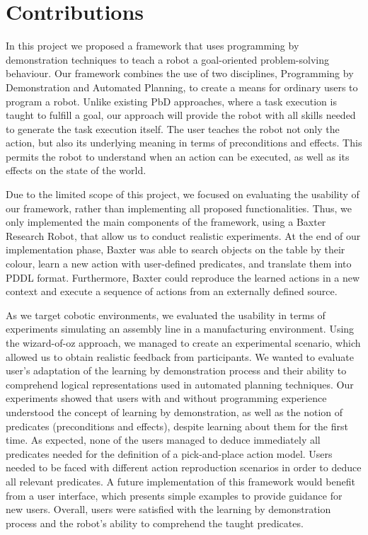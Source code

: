 \section{Contributions}
In this project we proposed a framework that uses programming by demonstration techniques to teach a robot a goal-oriented problem-solving behaviour.
Our framework combines the use of two disciplines, Programming by Demonstration and Automated Planning, to create a means for ordinary users to program a robot.
Unlike existing PbD approaches, where a task execution is taught to fulfill a goal, our approach will provide the robot with all skills needed to generate the task execution itself.
The user teaches the robot not only the action, but also its underlying meaning in terms of preconditions and effects.
This permits the robot to understand when an action can be executed, as well as its effects on the state of the world.


Due to the limited scope of this project, we focused on evaluating the usability of our framework, rather than implementing all proposed functionalities.
Thus, we only implemented the main components of the framework, using a Baxter Research Robot, that allow us to conduct realistic experiments.
At the end of our implementation phase, Baxter was able to search objects on the table by their colour, learn a new action with user-defined predicates, and translate them into PDDL format.
Furthermore, Baxter could reproduce the learned actions in a new context and execute a sequence of actions from an externally defined source.

As we target cobotic environments, we evaluated the usability in terms of experiments simulating an assembly line in a manufacturing environment.
Using the wizard-of-oz approach, we managed to create an experimental scenario, which allowed us to obtain realistic feedback from participants.
We wanted to evaluate user's adaptation of the learning by demonstration process and their ability to comprehend logical representations used in automated planning techniques.
Our experiments showed that users with and without programming experience understood the concept of learning by demonstration, as well as the notion of predicates (preconditions and effects), despite learning about them for the first time.
As expected, none of the users managed to deduce immediately all predicates needed for the definition of a pick-and-place action model.
Users needed to be faced with different action reproduction scenarios in order to deduce all relevant predicates.
A future implementation of this framework would benefit from a user interface, which presents simple examples to provide guidance for new users.
Overall, users were satisfied with the learning by demonstration process and the robot's ability to comprehend the taught predicates.

